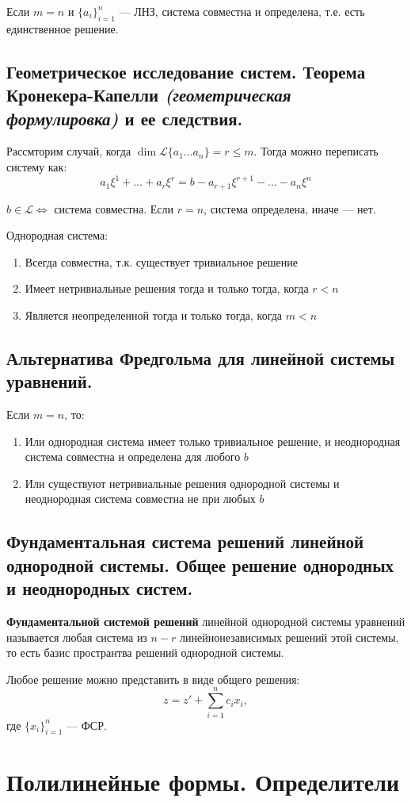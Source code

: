 \begin{theorem}
    Если $m=n$ и $\{a_i\}_{i=1}^n$ --- ЛНЗ, система совместна и определена, т.е. есть единственное решение.
\end{theorem}
\subsection{Геометрическое исследование систем. Теорема Кронекера-Капелли \textit{(геометрическая формулировка)} и ее следствия.}
Рассмторим случай, когда $\dim\mathcal{L}\{a_1\ldots a_n\}=r\leq m$. Тогда можно переписать систему как: $$a_1\xi^1+\ldots+a_r\xi^r=b-a_{r+1}\xi^{r+1}-\ldots-a_n\xi^n$$
\begin{theorem}
    $b\in\mathcal L \Leftrightarrow$ система совместна. Если $r=n$, система определена, иначе --- нет.
\end{theorem}
\begin{consequence}
    Однородная система:
    \begin{enumerate}
        \item Всегда совместна, т.к. существует тривиальное решение
        \item Имеет нетривиальные решения тогда и только тогда, когда $r<n$
        \item Является неопределенной тогда и только тогда, когда $m<n$
    \end{enumerate}
\end{consequence}
\subsection{Альтернатива Фредгольма для линейной системы уравнений.}
\begin{theorem}
    Если $m=n$, то:
    \begin{enumerate}
        \item Или однородная система имеет только тривиальное решение, и неоднородная система совместна и определена для любого $b$
        \item Или существуют нетривиальные решения однородной системы и неоднородная система совместна не при любых $b$
    \end{enumerate}
\end{theorem}
\subsection{Фундаментальная система решений линейной однородной системы. Общее решение однородных и неоднородных систем.}
\begin{definition}
    \textbf{Фундаментальной системой решений} линейной однородной системы уравнений называется любая система из $n − r$ линейнонезависимых решений этой системы, то есть базис пространтва решений однородной системы.
\end{definition}
Любое решение можно представить в виде общего решения: $$z=z'+\sum\limits_{i=1}^n c_ix_i,$$ где $\{x_i\}_{i=1}^n$ --- ФСР.
\section{Полилинейные формы. Определители}
